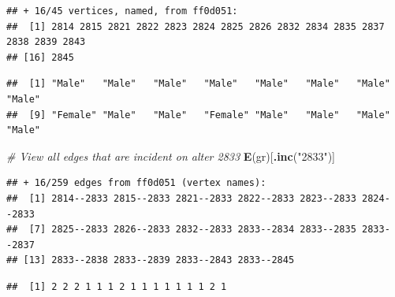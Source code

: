 \documentclass[
]{book}
\newenvironment{Shaded}{\begin{snugshade}}{\end{snugshade}}
\newcommand{\CommentTok}[1]{\textcolor[rgb]{0.56,0.35,0.01}{\textit{#1}}}
\newcommand{\FunctionTok}[1]{\textcolor[rgb]{0.13,0.29,0.53}{\textbf{#1}}}
\newcommand{\NormalTok}[1]{#1}
\newcommand{\SpecialCharTok}[1]{\textcolor[rgb]{0.81,0.36,0.00}{\textbf{#1}}}
\newcommand{\StringTok}[1]{\textcolor[rgb]{0.31,0.60,0.02}{#1}}
\begin{document}
\begin{verbatim}
## + 16/45 vertices, named, from ff0d051:
##  [1] 2814 2815 2821 2822 2823 2824 2825 2826 2832 2834 2835 2837 2838 2839 2843
## [16] 2845
\end{verbatim}

\begin{Shaded}
\end{Shaded}

\begin{verbatim}
##  [1] "Male"   "Male"   "Male"   "Male"   "Male"   "Male"   "Male"   "Male"  
##  [9] "Female" "Male"   "Male"   "Female" "Male"   "Male"   "Male"   "Male"
\end{verbatim}

\begin{Shaded}
\begin{Highlighting}[]
\CommentTok{\# View all edges that are incident on alter 2833}
\FunctionTok{E}\NormalTok{(gr)[}\FunctionTok{.inc}\NormalTok{(}\StringTok{"2833"}\NormalTok{)]}
\end{Highlighting}
\end{Shaded}

\begin{verbatim}
## + 16/259 edges from ff0d051 (vertex names):
##  [1] 2814--2833 2815--2833 2821--2833 2822--2833 2823--2833 2824--2833
##  [7] 2825--2833 2826--2833 2832--2833 2833--2834 2833--2835 2833--2837
## [13] 2833--2838 2833--2839 2833--2843 2833--2845
\end{verbatim}

\begin{Shaded}
\end{Shaded}

\begin{verbatim}
##  [1] 2 2 2 1 1 1 2 1 1 1 1 1 1 1 2 1
\end{verbatim}

\begin{Shaded}
\end{Shaded}
\end{document}
